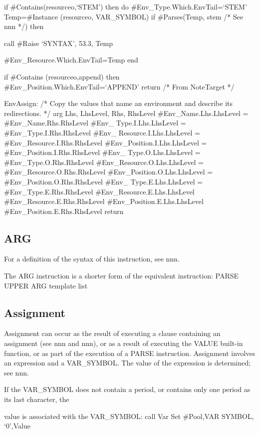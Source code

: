 if \#Contains(resourceo,`STEM') then do \#Env\_Type.Which.EnvTail=`STEM'
Temp=\#Instance (resourceo, VAR\_SYMBOL) if \#Parses(Temp, stem /* See
nnn */) then

call \#Raise `SYNTAX', 53.3, Temp

\#Env\_Resource.Which.EnvTail=Temp end

if \#Contains (resourceo,append) then
\#Env\_Position.Which.EnvTail=`APPEND' return /* From NoteTarget */

EnvAssign: /* Copy the values that name an environment and describe its
redirections. */ arg Lhs, LhsLevel, Rhs, RhsLevel
\#Env\_Name.Lhs.LhsLevel = \#Env\_Name.Rhs.RhsLevel \#Env\_
Type.I.Lhs.LhsLevel = \#Env\_Type.I.Rhs.RhsLevel \#Env\_
Resource.I.Lhs.LhsLevel = \#Env\_Resource.I.Rhs.RhsLevel
\#Env\_Position.I.Lhs.LhsLevel = \#Env\_Position.I.Rhs.RhsLevel \#Env\_
Type.O.Lhs.LhsLevel = \#Env\_Type.O.Rhs.RhsLevel
\#Env\_Resource.O.Lhs.LhsLevel = \#Env\_Resource.O.Rhs.RhsLevel
\#Env\_Position.O.Lhs.LhsLevel = \#Env\_Position.O.Rhs.RhsLevel \#Env\_
Type.E.Lhs.LhsLevel = \#Env\_Type.E.Rhs.RhsLevel
\#Env\_Resource.E.Lhs.LhsLevel \#Env\_Resource.E.Rhs.RhsLevel
\#Env\_Position.E.Lhs.LhsLevel \#Env\_Position.E.Rhs.RhsLevel return

\hypertarget{arg}{%
\subsection{ARG}\label{arg}}

For a definition of the syntax of this instruction, see nnn.

The ARG instruction is a shorter form of the equivalent instruction:
PARSE UPPER ARG template list

\hypertarget{assignment}{%
\subsection{Assignment}\label{assignment}}

Assignment can occur as the result of executing a clause containing an
assignment (see nnn and nnn), or as a result of executing the VALUE
built-in function, or as part of the execution of a PARSE instruction.
Assignment involves an expression and a VAR\_SYMBOL. The value of the
expression is determined; see nnn.

If the VAR\_SYMBOL does not contain a period, or contains only one
period as its last character, the

value is associated with the VAR\_SYMBOL: call Var Set \#Pool,VAR
SYMBOL, `0',Value

